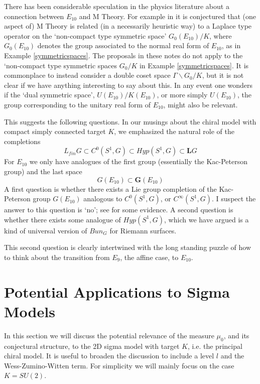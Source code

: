 \documentclass{amsart}
\theoremstyle{conjecture}
\theoremstyle{definition}
\theoremstyle{question}
\theoremstyle{questions}
\theoremstyle{remark}
\theoremstyle{remarks}
\theoremstyle{example}
\numberwithin{equation}{section}
\begin{document}
There has been considerable speculation in the physics literature about a connection between  $E_{10}$ and M Theory.
For example in \cite{BGH} it is conjectured that (one aspect of) M Theory is related (in a necessarily heuristic way)
to a Laplace type operator on the `non-compact type symmetric space' $G_0(E_{10})/K$, where $G_0(E_{10})$ denotes the group associated to the normal real form of $E_{10}$, as in Example \ref{symmetricspaces}. The proposals in these notes do not apply to the `non-compact type symmetric spaces $G_0/K$ in Example \ref{symmetricspaces}. It is commonplace to instead consider a double coset space $\Gamma\backslash G_0/K$, but it is not clear if we have anything interesting to say about this. In any event one wonders if the `dual symmetric space', $U(E_{10})/K(E_{10})$,
or more simply $U(E_{10})$, the group corresponding to the unitary real form of $E_{10}$, might also be relevant.

This suggests the following questions. In our musings about the chiral model with compact simply connected target $K$, we emphasized the natural role of the completions
$$L_{fin}G \subset C^{0}(S^1,G) \subset Hyp(S^1,G) \subset \mathbf L G $$
For $E_{10}$ we only have analogues of the first group (essentially the Kac-Peterson group) and the last space
$$G(E_{10}) \subset \mathbf G (E_{10}) $$
A first question is whether there exists a Lie group completion of the Kac-Peterson group $G(E_{10})$
analogous to $C^0(S^1,G)$, or $C^{\infty}(S^1,G)$. I suspect the answer to this question is `no'; see \cite{Pi5} for some evidence. A second question is whether there exists some analogue of $Hyp(S^1,G)$, which we have argued
is a kind of universal version of $Bun_G$ for Riemann surfaces.

This second question is clearly intertwined with the long standing puzzle of how to think about the transition
from $E_9$, the affine case, to $E_{10}$.


\section{ Potential Applications to Sigma Models}\label{sigmamodel}


In this section we will discuss the potential relevance of the measure $\mu_0$, and its conjectural structure, to the 2D sigma model with target $K$, i.e. the principal chiral model. It is useful to broaden the discussion to include a level $l$ and the Wess-Zumino-Witten term. For simplicity we will mainly focus on the case $K=SU(2)$. 
\end{document}
